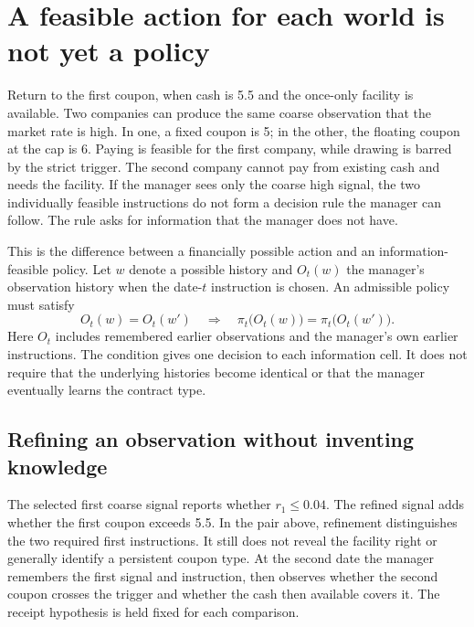 \section{A feasible action for each world is not yet a policy}
\label{sim:certified-observation-policies}

Return to the first coupon, when cash is 5.5 and the once-only facility is available. Two companies can produce the same coarse observation that the market rate is high. In one, a fixed coupon is 5; in the other, the floating coupon at the cap is 6. Paying is feasible for the first company, while drawing is barred by the strict trigger. The second company cannot pay from existing cash and needs the facility. If the manager sees only the coarse high signal, the two individually feasible instructions do not form a decision rule the manager can follow. The rule asks for information that the manager does not have.

This is the difference between a financially possible action and an information-feasible policy. Let $w$ denote a possible history and $O_t(w)$ the manager's observation history when the date-$t$ instruction is chosen. An admissible policy must satisfy
\begin{equation}
 O_t(w)=O_t(w')\quad\Longrightarrow\quad
 \pi_t\bigl(O_t(w)\bigr)=\pi_t\bigl(O_t(w')\bigr).
 \label{eq:certified-information-policy}
\end{equation}
Here $O_t$ includes remembered earlier observations and the manager's own earlier instructions. The condition gives one decision to each information cell. It does not require that the underlying histories become identical or that the manager eventually learns the contract type.

\subsection{Refining an observation without inventing knowledge}

The selected first coarse signal reports whether $r_1\leq0.04$. The refined signal adds whether the first coupon exceeds 5.5. In the pair above, refinement distinguishes the two required first instructions. It still does not reveal the facility right or generally identify a persistent coupon type. At the second date the manager remembers the first signal and instruction, then observes whether the second coupon crosses the trigger and whether the cash then available covers it. The receipt hypothesis is held fixed for each comparison.

